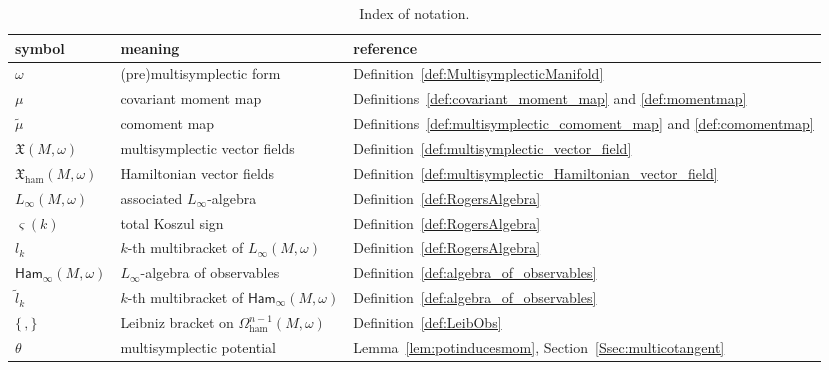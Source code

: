 \documentclass[10pt,a4paper]{amsart}
\numberwithin{equation}{section}
\newcommand{\g}{\mathfrak{g}}
\newcommand{\Ham}{\mathsf{Ham}}
\newcommand{\ham}{\text{ham}}
\newcommand{\X}{\mathfrak{X}}
\begin{document}
\begin{table}[t]
	\centering\renewcommand{\arraystretch}{1.22}
	\caption{Index of notation.}	\label{tab:symbols}

\vspace{1mm}

	\begin{tabular}{lll}
 \hline
		symbol			&meaning			&reference		\\ \hline%
		$\omega$		&(pre)multisymplectic form		&Definition~\ref{def:MultisymplecticManifold}		\\
		$\mu$			&covariant moment map			&Definitions~\ref{def:covariant_moment_map} and \ref{def:momentmap}		\\
		$\widetilde\mu$		&comoment map				&Definitions~\ref{def:multisymplectic_comoment_map} and \ref{def:comomentmap}		\\
		$\X(M,\omega)$		&multisymplectic vector fields		&Definition~\ref{def:multisymplectic_vector_field}			\\
		$\X_\ham(M,\omega)$	&Hamiltonian vector fields		&Definition~\ref{def:multisymplectic_Hamiltonian_vector_field}	\\
		$L_\infty(M,\omega)$	&associated $L_\infty$-algebra		&Definition~\ref{def:RogersAlgebra}			\\
		$\varsigma(k)$		&total Koszul sign			&Definition~\ref{def:RogersAlgebra}	\\
		$l_k$			&$k$-th multibracket of $L_\infty(M,\omega)$	&Definition~\ref{def:RogersAlgebra}	\\
		$\Ham_\infty(M,\omega)$	&$L_\infty$-algebra of observables
										&Definition~\ref{def:algebra_of_observables}	\\
		$\tilde{l}_k$		&$k$-th multibracket of 	$\Ham_\infty(M,\omega)$	&Definition~\ref{def:algebra_of_observables}	\\
		$\{\,,\}$		&Leibniz bracket on $\Omega_\ham^{n-1}(M,\omega)$	&Definition~\ref{def:LeibObs}	\\
		$\theta$		&multisymplectic potential		&Lemma~\ref{lem:potinducesmom}, Section~\ref{Ssec:multicotangent}	\\

\end{tabular}
\end{table}
\end{document}
